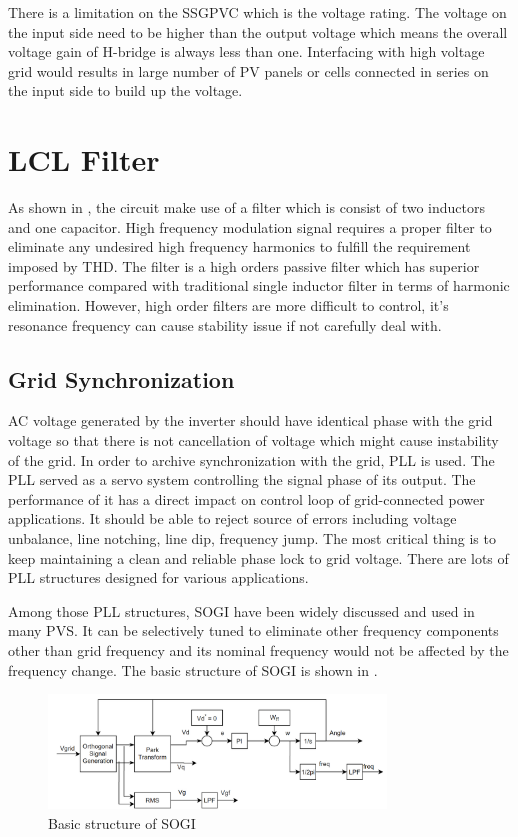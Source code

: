 There is a limitation on the \gls{SSGPVC} which is the voltage rating. The voltage on the input side need to be higher than the output voltage which means the overall voltage gain of H-bridge is always less than one. Interfacing with high voltage grid would results in large number of \gls{PV} panels or cells connected in series on the input side to build up the voltage. 

\section{LCL Filter}

As shown in , the circuit make use of a filter which is consist of two inductors and one capacitor. High frequency modulation signal requires a proper filter to eliminate any undesired high frequency harmonics to fulfill the requirement imposed by THD. The filter is a high orders passive filter which has superior performance compared with traditional single inductor filter in terms of harmonic elimination. However, high order filters are more difficult to control, it's resonance frequency can cause stability issue if not carefully deal with\cite{RN15}.

\subsection{Grid Synchronization}
\gls{AC} voltage generated by the inverter should have identical phase with the grid voltage so that there is not cancellation of voltage which might cause instability of the grid. In order to archive synchronization with the grid, \gls{PLL} is used. The \gls{PLL} served as a servo system controlling the signal phase of its output. The performance of it has a direct impact on control loop of grid-connected power applications. It should be able to reject source of errors including voltage unbalance, line notching, line dip, frequency jump. The most critical thing is to keep maintaining a clean and reliable phase lock to grid voltage. There are lots of \gls{PLL} structures designed for various applications. 

Among those \gls{PLL} structures, \gls{SOGI} have been widely discussed and used in many \gls{PVS}. It can be selectively tuned to eliminate other frequency components other than grid frequency and its nominal frequency would not be affected by the frequency change\cite{RN12}. The basic structure of \gls{SOGI} is shown in .
\begin{figure}[t]
     \centering
     \includegraphics[width = 0.8\textwidth]{figures/SOGI.png}
     \caption{Basic structure of SOGI}
     \label{fig:SOGI}
\end{figure}

